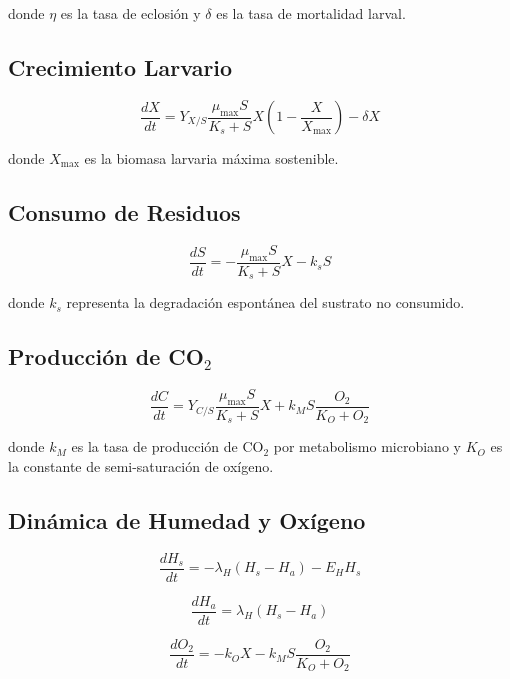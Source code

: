 \documentclass[12pt]{article}
\begin{document}
donde $\eta$ es la tasa de eclosión y $\delta$ es la tasa de mortalidad larval.

\subsection{Crecimiento Larvario}
\begin{equation}
    \frac{dX}{dt} = Y_{X/S} \frac{\mu_{\max} S}{K_s + S} X \left( 1 - \frac{X}{X_{\max}} \right) - \delta X
\end{equation}

donde $X_{\max}$ es la biomasa larvaria máxima sostenible.

\subsection{Consumo de Residuos}
\begin{equation}
    \frac{dS}{dt} = -\frac{\mu_{\max} S}{K_s + S} X - k_s S
\end{equation}

donde $k_s$ representa la degradación espontánea del sustrato no consumido.

\subsection{Producción de CO$_2$}
\begin{equation}
    \frac{dC}{dt} = Y_{C/S} \frac{\mu_{\max} S}{K_s + S} X + k_M S \frac{O_2}{K_O + O_2}
\end{equation}

donde $k_M$ es la tasa de producción de CO$_2$ por metabolismo microbiano y $K_O$ es la constante de semi-saturación de oxígeno.

\subsection{Dinámica de Humedad y Oxígeno}
\begin{equation}
    \frac{dH_s}{dt} = -\lambda_H (H_s - H_a) - E_H H_s
\end{equation}

\begin{equation}
    \frac{dH_a}{dt} = \lambda_H (H_s - H_a)
\end{equation}

\begin{equation}
    \frac{dO_2}{dt} = -k_O X - k_M S \frac{O_2}{K_O + O_2}
\end{equation}
\end{document}
